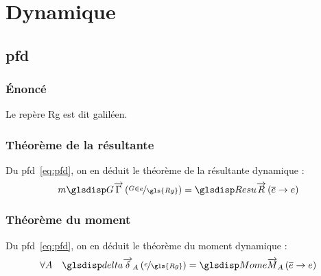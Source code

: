 \chapter{Dynamique}


\section[Principe Fondamental de la Dynamique]{\gls{pfd}}
	\subsection{\'Enoncé}
	\label{sec:pfd}
\begin{theorem}
\end{theorem}
	Le repère \gls{Rg} est dit galiléen.
	
	\subsection{Théorème de la résultante}
	Du \gls{pfd}~\eqref{eq:pfd}, on en déduit le théorème de la résultante dynamique :
	\begin{equation}
		m\G[\gls{Rg}]{G}{e}=\R{\overline{e}}{e}
	\end{equation}

	\subsection{Théorème du moment}
	Du \gls{pfd}~\eqref{eq:pfd}, on en déduit le théorème du moment dynamique :
	\begin{equation}
		\forall A\quad \mdyn[\gls{Rg}]{A}{e}=\M{A}{\overline{e}}{e}
	\end{equation}

